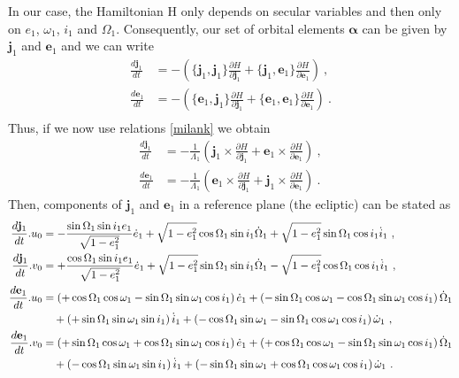 \documentclass[a4paper]{article}
\begin{document}
In our case, the Hamiltonian H only depends on secular variables and then only on $e_{1}$, $\omega_{1}$, $i_{1}$ and $\Omega_{1}$. Consequently, our set of orbital elements $\mathbf{\alpha}$ can be given by $\mathbf j_{1}$ and $\mathbf e_{1}$ and we can write
\begin{align}
\frac{d \mathbf j_{1}}{d t} & = - \left( \{\mathbf j_{1},\mathbf j_{1} \} \frac{\partial H}{\partial \mathbf j_{1} } + \{\mathbf j_{1},\mathbf e_{1} \} \frac{\partial H}{\partial \mathbf e_{1}}\right ) \  ,\\
\frac{d \mathbf e_{1}}{d t} & = - \left( \{\mathbf e_{1},\mathbf j_{1}\} \frac{\partial H}{\partial \mathbf j_{1}} + \{\mathbf e_{1},\mathbf e_{1}\} \frac{\partial H}{\partial \mathbf e_{1}} \right ) \ . \\
\end{align}
Thus, if we now use relations \eqref{milank} we obtain
\begin{align}
\label{dj_dt}
\frac{d \mathbf j_{1}}{d t} & = - \frac{1}{\Lambda_{1}}\left( \mathbf j_{1} \times \frac{\partial H}{\partial \mathbf j_{1} } + \mathbf e_{1} \times \frac{\partial H}{\partial \mathbf e_{1}}\right ) \ , \\
\label{de_dt}
\frac{d \mathbf e_{1}}{d t} & = - \frac{1}{\Lambda_{1}}\left( \mathbf e_{1} \times \frac{\partial H}{\partial \mathbf j_{1}} + \mathbf j_{1} \times \frac{\partial H}{\partial \mathbf e_{1}} \right )  \ .
\end{align}
Then, components of $\mathbf j_{1}$ and $\mathbf e_{1}$ in a reference plane (the ecliptic) can be stated as
\begin{align}
\frac{d \mathbf j_{1}}{d t}.u_{0} &= 
-\frac{\sin{\Omega_{1}}\sin{i_{1}}e_{1}}{\sqrt{1-e_{1}^{2}}}\dot{e}_{1}
+\sqrt{1-e_{1}^{2}}\cos{\Omega_{1}}\sin{i_{1}}\dot{\Omega}_{1}
+\sqrt{1-e_{1}^{2}}\sin{\Omega_{1}}\cos{i_{1}}\dot{i}_{1} \ , \\
\frac{d \mathbf j_{1}}{d t}.v_{0} &= 
+\frac{\cos{\Omega_{1}}\sin{i_{1}}e_{1}}{\sqrt{1-e_{1}^{2}}}\dot{e}_{1}
+\sqrt{1-e_{1}^{2}}\sin{\Omega_{1}}\sin{i_{1}}\dot{\Omega}_{1}
-\sqrt{1-e_{1}^{2}}\cos{\Omega_{1}}\cos{i_{1}}\dot{i}_{1} \ , \\
\frac{d \mathbf e_{1}}{d t}.u_{0} &= 
\left( +\cos{\Omega_{1}}\cos{\omega_{1}}-\sin{\Omega_{1}}\sin{\omega_{1}}\cos{i_{1}} \right) \dot{e}_{1}
+\left( -\sin{\Omega_{1}}\cos{\omega_{1}}-\cos{\Omega_{1}}\sin{\omega_{1}}\cos{i_{1}} \right) \dot{\Omega}_{1}  \notag \\
& \quad +\left( +\sin{\Omega_{1}}\sin{\omega_{1}}\sin{i_{1}} \right) \dot{i}_{1}
+\left( -\cos{\Omega_{1}}\sin{\omega_{1}}-\sin{\Omega_{1}}\cos{\omega_{1}}\cos{i_{1}} \right) \dot{\omega}_{1} \ , \\
\frac{d \mathbf e_{1}}{d t}.v_{0} &= 
\left( +\sin{\Omega_{1}}\cos{\omega_{1}}+\cos{\Omega_{1}}\sin{\omega_{1}}\cos{i_{1}} \right) \dot{e}_{1}
+\left( +\cos{\Omega_{1}}\cos{\omega_{1}}-\sin{\Omega_{1}}\sin{\omega_{1}}\cos{i_{1}} \right) \dot{\Omega}_{1}  \notag \\
& \quad +\left( -\cos{\Omega_{1}}\sin{\omega_{1}}\sin{i_{1}} \right) \dot{i}_{1}
+\left( -\sin{\Omega_{1}}\sin{\omega_{1}}+\cos{\Omega_{1}}\cos{\omega_{1}}\cos{i_{1}} \right) \dot{\omega}_{1} \ .
\end{align}
\end{document}
